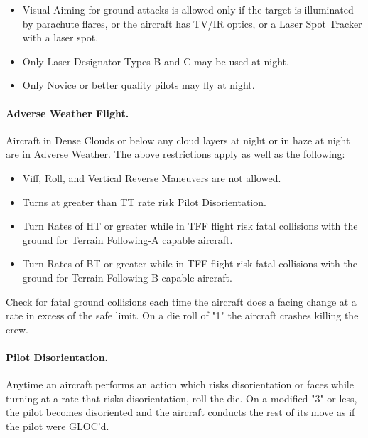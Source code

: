 \begin{advancedrules}
\begin{itemize}
    \item Visual Aiming for ground attacks is allowed only if the target is illuminated by parachute flares, or the aircraft has TV/IR optics, or a Laser Spot Tracker with a laser spot.

    \item Only Laser Designator Types B and C may be used at night.

    \item Only Novice or better quality pilots may fly at night.

\end{itemize}

\paragraph{Adverse Weather Flight.} Aircraft in Dense Clouds or below any cloud layers at night or in haze at night are in Adverse Weather. The above restrictions apply as well as the following:

\begin{itemize}

    \item Viff, Roll, and Vertical Reverse Maneuvers are not allowed.

    \item Turns at greater than TT rate risk Pilot Disorientation.

    \item Turn Rates of HT or greater while in TFF flight risk fatal collisions with the ground for Terrain Following-A capable aircraft.  

    \item Turn Rates of BT or greater while in TFF flight risk fatal collisions with the ground for Terrain Following-B capable aircraft.


\end{itemize}

Check for fatal ground collisions each time the aircraft does a facing change at a rate in excess of the safe limit. On a die roll of "1" the aircraft crashes killing the crew.

\paragraph{Pilot Disorientation.} Anytime an aircraft performs an action which risks disorientation or faces while turning at a rate that risks disorientation, roll the die. On a modified "3" or less, the pilot becomes disoriented and the aircraft conducts the rest of its move as if the pilot were GLOC'd. 


\end{advancedrules}
